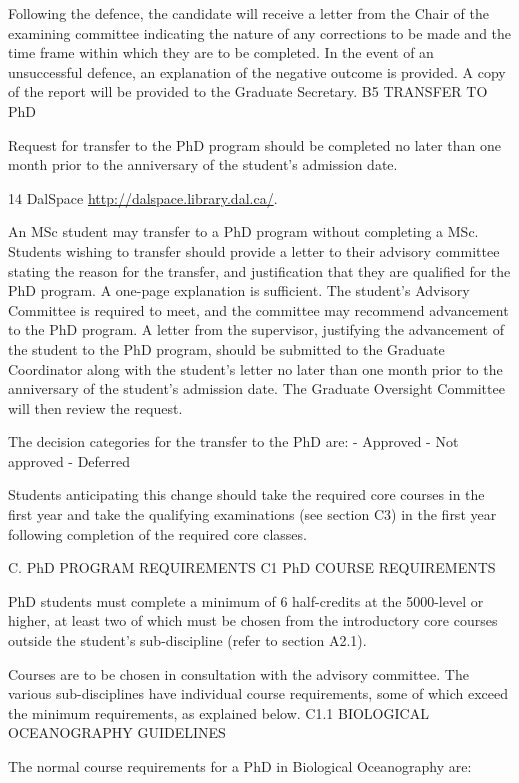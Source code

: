 \documentclass{article}
\newcommand\elink[1]{\url{#1}}
\begin{document}
Following the defence, the candidate will receive a letter from the Chair of the examining committee indicating the nature of any corrections to be made and the time frame within which they are to be completed. In the event of an unsuccessful defence, an explanation of the negative outcome is provided. A copy of the report will be provided to the Graduate Secretary.
B5	TRANSFER TO PhD

Request for transfer to the PhD program should be completed no later than one month prior to the anniversary of the student’s admission date.



14 DalSpace \elink{http://dalspace.library.dal.ca/}.
 

An MSc student may transfer to a PhD program without completing a MSc. Students wishing to transfer should provide a letter to their advisory committee stating the reason for the transfer, and justification that they are qualified for the PhD program. A one-page explanation is sufficient. The student’s Advisory Committee is required to meet, and the committee may recommend advancement to the PhD program. A letter from the supervisor, justifying the advancement of the student to the PhD program, should be submitted to the Graduate Coordinator along with the student’s letter no later than one month prior to the anniversary of the student’s admission date. The Graduate Oversight Committee will then review the request.

The decision categories for the transfer to the PhD are:
-	Approved
-	Not approved
-	Deferred

Students anticipating this change should take the required core courses in the first year and take the qualifying examinations (see section C3) in the first year following completion of the required core classes.

C.	PhD  PROGRAM REQUIREMENTS
C1	PhD COURSE REQUIREMENTS

PhD students must complete a minimum of 6 half-credits at the 5000-level or higher, at least two of which must be chosen from the introductory core courses outside the student’s sub-discipline (refer to section A2.1).

Courses are to be chosen in consultation with the advisory committee. The various sub-disciplines have individual course requirements, some of which exceed the minimum requirements, as explained below.
C1.1	BIOLOGICAL OCEANOGRAPHY GUIDELINES

The normal course requirements for a PhD in Biological Oceanography are:
\end{document}
